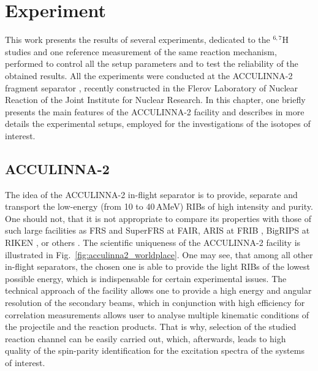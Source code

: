 \section{Experiment}

This work presents the results of several experiments, dedicated to the $^{6,7}$H studies and one reference measurement of the same reaction mechanism, performed to control all the setup parameters and to test the reliability of the obtained results.
All the experiments were conducted at the ACCULINNA-2 fragment separator \cite{Fomichev:2018}, recently constructed in the Flerov Laboratory of Nuclear Reaction of the Joint Institute for Nuclear Research. 
In this chapter, one briefly presents the main features of the ACCULINNA-2 facility and describes in more details the experimental setups, employed for the investigations of the isotopes of interest.

\subsection{ACCULINNA-2}

The idea of the ACCULINNA-2 in-flight separator is to provide, separate and transport the low-energy (from 10 to 40\,AMeV) RIBs of high intensity and purity. 
One should not, that it is not appropriate to compare its properties with those of such large facilities as FRS \cite{geissel:1992} and SuperFRS \cite{geissel:2003,winkler:2008} at FAIR, ARIS at FRIB \cite{gao:2015}, BigRIPS at RIKEN \cite{kubo:2003}, or others \cite{cuttone:2007,www:ganil,www:isolde}.
The scientific uniqueness of the ACCULINNA-2 facility is illustrated in Fig.\ \ref{fig:acculinna2_worldplace}.
One may see, that among all other in-flight separators, the chosen one is able to provide the light RIBs of the lowest possible energy, which is indispensable for certain experimental issues.
The technical approach of the facility allows one to provide a high energy and angular resolution of the secondary beams, which in conjunction with high efficiency for correlation measurements allows user to analyse multiple kinematic conditions of the projectile and the reaction products.  
That is why, selection of the studied reaction channel can be easily carried out, which, afterwards, leads to high quality of the spin-parity identification for the excitation spectra of the systems of interest.

